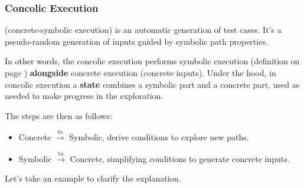 \newpage

\subsubsection{Concolic Execution}\label{subsubsection: Concolic Execution}

 (concrete-symbolic execution) is an automatic generation of test cases. It's a pseudo-random generation of inputs guided by symbolic path properties.

\highspace
In other words, the concolic execution performs symbolic execution (definition on page \pageref{def: symbolic execution}) \textbf{alongside} concrete execution (concrete inputs). Under the hood, in concolic execution a \textbf{state} combines a symbolic part and a concrete part, used as needed to make progress in the exploration.

\highspace
The steps are then as follows:
\begin{itemize}
    \item Concrete $\xrightarrow{\text{to}}$ Symbolic, derive conditions to explore new paths.
    
    \item Symbolic $\xrightarrow{\text{to}}$ Concrete, simplifying conditions to generate concrete inputs.
\end{itemize}
Let's take an example to clarify the explanation.

